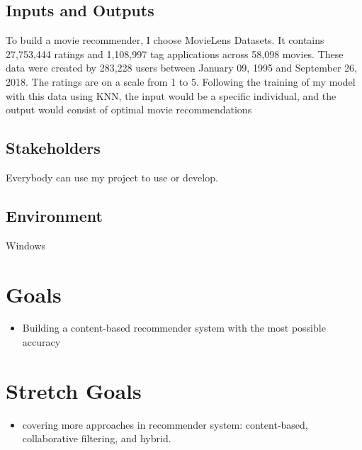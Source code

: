 \documentclass{article}
\begin{document}
\subsection{Inputs and Outputs}

To build a movie recommender, I choose MovieLens Datasets. It contains 27,753,444 ratings and 1,108,997 tag applications across 58,098 movies. These data were created by 283,228 users between January 09, 1995 and September 26, 2018. The ratings are on a scale from 1 to 5.
Following the training of my model with this data using KNN, the input would be a specific individual, and the output would consist of optimal movie recommendations


\subsection{Stakeholders}
Everybody can use my project to use or develop. 

\subsection{Environment}

Windows

\section{Goals}

\begin{itemize}
    
    \item Building a content-based recommender system with the most possible accuracy
    
\end{itemize}



\section{Stretch Goals}

    \begin{itemize}
        \item covering more approaches in recommender system: content-based, collaborative filtering, and hybrid.
    \end{itemize}
\end{document}
